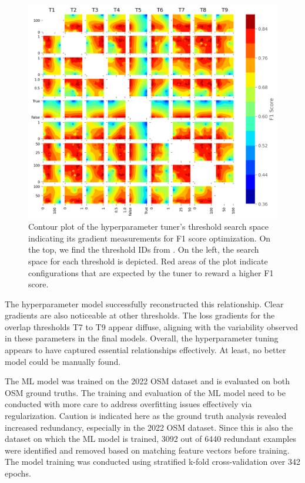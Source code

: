 \begin{figure}[!t]
\centering 
\includegraphics[width=\linewidth]{images/matching-hpt-contour-topological-osm-updated.png}
\caption{Contour plot of the hyperparameter tuner's threshold search space indicating its gradient measurements for F1 score optimization. On the top, we find the threshold IDs from . On the left, the search space for each threshold is depicted. Red areas of the plot indicate configurations that are expected by the tuner to reward a higher F1 score.}
\label{fig:hyperparameter-contourplot}
\end{figure}

The hyperparameter model successfully reconstructed this relationship. Clear gradients are also noticeable at other thresholds. The loss gradients for the overlap thresholds T7 to T9 appear diffuse, aligning with the variability observed in these parameters in the final models. Overall, the hyperparameter tuning appears to have captured essential relationships effectively. At least, no better model could be manually found.

The ML model was trained on the 2022 OSM dataset and is evaluated on both OSM ground truths. The training and evaluation of the ML model need to be conducted with more care to address overfitting issues effectively via regularization. Caution is indicated here as the ground truth analysis revealed increased redundancy, especially in the 2022 OSM dataset. Since this is also the dataset on which the ML model is trained, 3092 out of 6440 redundant examples were identified and removed based on matching feature vectors before training. The model training was conducted using stratified k-fold cross-validation over 342 epochs.

